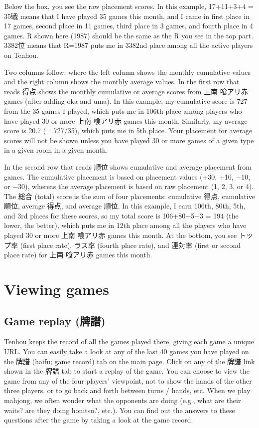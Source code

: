 Below the box, you see the raw placement scores. In this example, 17+11+3+4 = 35戦 means that I have played 35 games this month, and I came in first place in 17 games, second place in 11 games, third place in 3 games, and fourth place in 4 games. R shown here (1987) should be the same as the R you see in the top part. 3382位 means that R=1987 puts me in 3382nd place among all the active players on {\jap Tenhou}. 

\bigskip
Two columns follow, where the left column shows the monthly cumulative values and the right column shows the monthly average values. 
In the first row that reads 得点 shows the monthly cumulative or average scores from 上南 喰アリ赤 games (after adding {\jap oka} and {\jap uma}). In this example, my cumulative score is 727 from the 35 games I played, which puts me in 106th place among players who have played 30 or more 上南 喰アリ赤 games this month. Similarly, my average score is 20.7 (= 727/35), which puts me in 5th place. Your placement for average scores will not be shown unless you have played 30 or more games of a given type in a given room in a given month. 

\bigskip
In the second row that reads 順位 shows cumulative and average placement from games. The cumulative placement is based on placement values (+30, +10, $-$10, or $-$30), whereas the average placement is based on raw placement (1, 2, 3, or 4). 
The 総合 (total) score is the sum of four placements: cumulative 得点, cumulative 順位, average 得点, and average 順位. In this example, I earn 106th, 80th, 5th, and 3rd places for these scores, so my total score is 106+80+5+3 = 194 (the lower, the better), which puts me in 12th place among all the players who have played 30 or more 上南 喰アリ赤 games this month. 
At the bottom, you see トップ率 (first place rate),  ラス率 (fourth place rate), and 連対率 (first or second place rate) for 上南 喰アリ赤 games this month. 

\section{Viewing games}
\subsection{Game replay (牌譜)}
{\jap Tenhou} keeps the record of all the games played there, giving each game a unique URL. 
You can easily take a look at any of the last 40 games you have played on the 牌譜 ({\jap haifu}; game record) tab on the main page. Click on any of the 牌譜 link shown in the 牌譜 tab to start a replay of the game. You can choose to view the game from any of the four players' viewpoint, not to show the hands of the other three players, or to go back and forth between turns / hands, etc. When we play mahjong, we often wonder what the opponents are doing (e.g., what are their waits? are they doing {\jap honitsu}?, etc.). You can find out the answers to these questions after the game by taking a look at the game record. 

